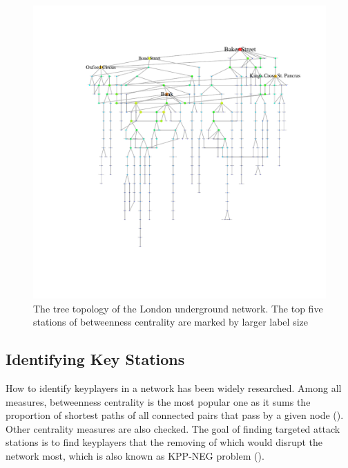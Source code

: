 \documentclass[a4paper,reqno,]{article}
\begin{document}
\begin{figure}[h]
\begin{minipage}[b]{0.5\textwidth}
\centering
    \captionsetup{width=.9\linewidth}
    \includegraphics[clip, trim=3cm 3cm 2cm 2cm,width=1\textwidth]{images/NW/london_tree_w.pdf}
    \caption{The tree topology of the London underground network. The top five stations of betweenness centrality are marked by larger label size}\label{fig:london_2}
\end{minipage}
\end{figure} 
\subsection{Identifying Key Stations}
\label{ssec:keystations}
How to identify keyplayers in a network has been widely researched. Among all measures, betweenness centrality is the most popular one as it sums the proportion of shortest paths of all connected pairs that pass by a given node (\cite{freeman1978centrality}). \\Other centrality measures are also checked. The goal of finding targeted attack stations is to find keyplayers that the removing of which would disrupt the network most, which is also known as KPP-NEG problem (\cite{borgatti2006identifying}).
\end{document}
